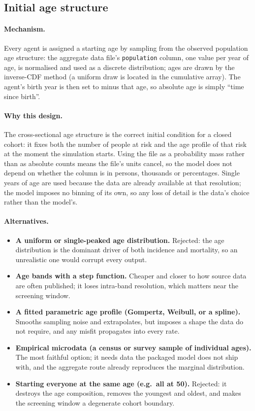 \documentclass[12pt,a4paper]{article}
\newcommand{\id}[1]{\texttt{#1}}
\newcommand{\mech}[1]{\paragraph{Mechanism.} #1}
\newcommand{\why}[1]{\paragraph{Why this design.} #1}
\newcommand{\alt}[1]{\paragraph{Alternatives.} #1}
\begin{document}
\subsection{Initial age structure}

\mech{Every agent is assigned a starting age by sampling from the observed population age structure: the
aggregate data file's \id{population} column, one value per year of age, is normalised and used as a
discrete distribution; ages are drawn by the inverse-CDF method (a uniform draw is located in the
cumulative array). The agent's birth year is then set to minus that age, so absolute age is simply
``time since birth''.}

\why{The cross-sectional age structure is the correct initial condition for a closed cohort: it fixes both
the number of people at risk and the age profile of that risk at the moment the simulation starts. Using
the file as a probability mass rather than as absolute counts means the file's units cancel, so the model
does not depend on whether the column is in persons, thousands or percentages. Single years of age are
used because the data are already available at that resolution; the model imposes no binning of its own,
so any loss of detail is the data's choice rather than the model's.}

\alt{\begin{itemize}[nosep]
  \item \textbf{A uniform or single-peaked age distribution.} Rejected: the age distribution is the
        dominant driver of both incidence and mortality, so an unrealistic one would corrupt every
        output.
  \item \textbf{Age bands with a step function.} Cheaper and closer to how source data are often
        published; it loses intra-band resolution, which matters near the screening window.
  \item \textbf{A fitted parametric age profile (Gompertz, Weibull, or a spline).} Smooths sampling noise
        and extrapolates, but imposes a shape the data do not require, and any misfit propagates into
        every rate.
  \item \textbf{Empirical microdata (a census or survey sample of individual ages).} The most faithful
        option; it needs data the packaged model does not ship with, and the aggregate route already
        reproduces the marginal distribution.
  \item \textbf{Starting everyone at the same age (e.g.\ all at 50).} Rejected: it destroys the age
        composition, removes the youngest and oldest, and makes the screening window a degenerate cohort
        boundary.
\end{itemize}}
\end{document}
